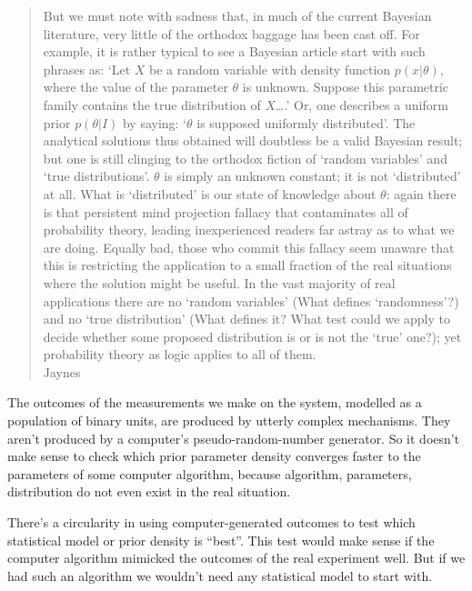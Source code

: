\documentclass[\ifafour a4paper,12pt,\else a5paper,10pt,\fi%
onecolumn,oneside,article,%
british%
]{memoir}
\theoremstyle{remark}
\theoremstyle{innote}
\newcommand*{\citey}{\parencites*}
\renewcommand*{\|}{\mathpunct{|}}
\newcommand*{\sect}{\S}%
\begin{document}
\begin{quotation}\small
  But we must note with sadness that, in much of the current Bayesian
  literature, very little of the orthodox baggage has been cast off. For
  example, it is rather typical to see a Bayesian article start with such
  phrases as: `Let $X$ be a random variable with density function
  $p(x|\theta)$, where the value of the parameter $\theta$ is unknown.
  Suppose this parametric family contains the true distribution of
  $X$\ldots.' Or, one describes a uniform prior $p(\theta|I)$ by saying:
  `$\theta$ is supposed uniformly distributed'. The analytical solutions
  thus obtained will doubtless be a valid Bayesian result; but one is still
  clinging to the orthodox fiction of `random variables' and `true
  distributions'. $\theta$ is simply an unknown constant; it is not
  `distributed' at all. What is `distributed' is our state of knowledge
  about $\theta$: again there is that persistent mind projection fallacy
  that contaminates all of probability theory, leading inexperienced
  readers far astray as to what we are doing. Equally bad, those who commit
  this fallacy seem unaware that this is restricting the application to a
  small fraction of the real situations where the solution might be useful.
  In the vast majority of real applications there are no `random variables'
  (What defines `randomness'?) and no `true distribution' (What defines it?
  What test could we apply to decide whether some proposed distribution is
  or is not the `true' one?); yet probability theory as logic applies to
  all of them.\\\small\mbox{}\hfill Jaynes
  \citey[\sect~17.12]{jaynes1994_r2003}
\end{quotation}

The outcomes of the measurements we make on the system, modelled as a
population of binary units, are produced by utterly complex mechanisms.
They aren't produced by a computer's pseudo-random-number generator. So it
doesn't make sense to check which prior parameter density converges faster
to the parameters of some computer algorithm, because algorithm,
parameters, distribution do not even exist in the real situation.

There's a circularity in using computer-generated outcomes to test which
statistical model or prior density is \enquote{best}. This test would make
sense if the computer algorithm mimicked the outcomes of the real
experiment well. But if we had such an algorithm we wouldn't need any
statistical model to start with.
\end{document}
